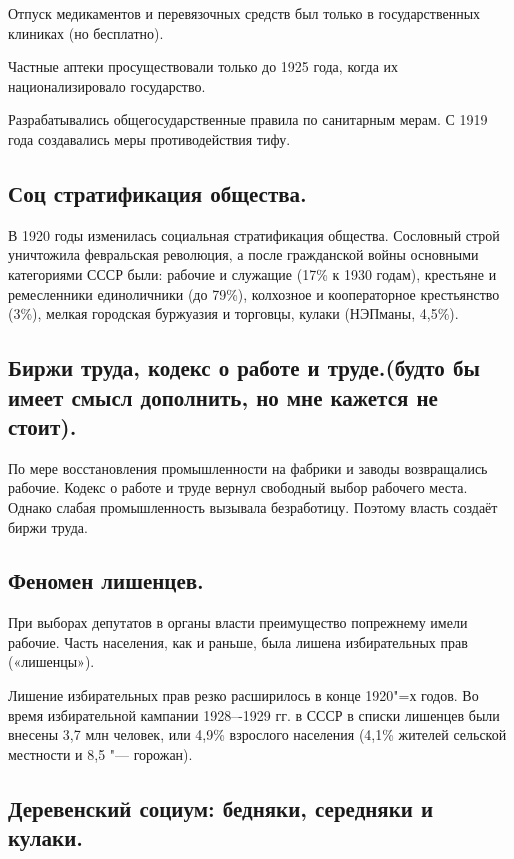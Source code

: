  Отпуск медикаментов и перевязочных средств был только в государственных клиниках (но бесплатно). 
 
 Частные аптеки просуществовали только до 1925 года, когда их национализировало государство. 
 
 Разрабатывались общегосударственные правила по санитарным мерам. С 1919 года создавались меры противодействия тифу.

 \subsection{Соц стратификация общества.}

 В 1920 годы изменилась социальная стратификация общества. Сословный строй уничтожила февральская революция, а после гражданской войны основными категориями СССР были: рабочие и служащие (17\% к 1930 годам), крестьяне и ремесленники единоличники (до 79\%), колхозное и кооператорное крестьянство (3\%), мелкая городская буржуазия и торговцы, кулаки (НЭПманы, 4,5\%).

 \subsection{Биржи труда, кодекс о работе и труде.(будто бы имеет смысл дополнить, но мне кажется не стоит).}

 По мере восстановления промышленности на фабрики и заводы возвращались рабочие. Кодекс о работе и труде вернул свободный выбор рабочего места. Однако слабая промышленность вызывала безработицу. Поэтому власть создаёт биржи труда. 

 \subsection{Феномен лишенцев.}

При выборах депутатов в органы власти преимущество попрежнему имели рабочие. Часть населения, как и раньше, была лишена избирательных прав («лишенцы»).

Лишение избирательных прав резко расширилось в конце 1920"=х годов. Во время избирательной кампании 1928–-1929 гг. в СССР в списки лишенцев были внесены 3,7 млн человек, или 4,9\% взрослого населения (4,1\% жителей сельской местности и 8,5 "--- горожан).

\subsection{Деревенский социум: бедняки, середняки и кулаки.}

